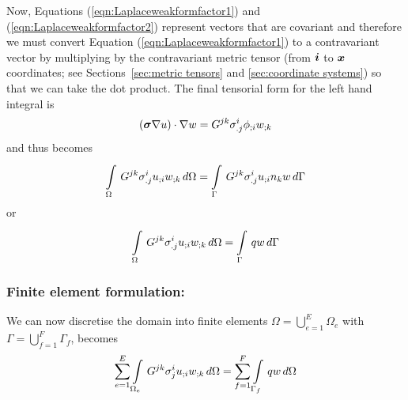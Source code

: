 Now, Equations (\ref{eqn:Laplaceweakformfactor1}) and (\ref{eqn:Laplaceweakformfactor2})
represent vectors that are covariant and therefore we must convert Equation
(\ref{eqn:Laplaceweakformfactor1}) to a contravariant vector by 
multiplying by the contravariant metric tensor (from $\boldsymbol{i}$ to $\boldsymbol{x}$ 
coordinates; see Sections~\ref{sec:metric tensors} and \ref{sec:coordinate systems})
so that we can take the dot product. The final tensorial form for the left
hand integral is
\begin{equation}
  \dotprod{\pbrac{\tensor{\sigma}\gradient{}{u}}}{\gradient{}{w}} = 
  G^{jk}\sigma^{i}_{.j}\covarderiv{\phi}{i}\covarderiv{w}{k}
\end{equation}
and thus  becomes
\begin{equation}
  \gint{\Omega}{}{G^{jk}\sigma^{i}_{.j}\covarderiv{u}{i}\covarderiv{w}{k}}{\Omega}
  = \gint{\Gamma}{}{G^{jk}\sigma^{i}_{.j}\covarderiv{u}{i}n_{k}w}{\Gamma}
  \label{eqn:Laplaceweightedresidualtensorform1}
\end{equation}
or
\begin{equation}
  \gint{\Omega}{}{G^{jk}\sigma^{i}_{.j}\covarderiv{u}{i}\covarderiv{w}{k}}{\Omega}
  = \gint{\Gamma}{}{qw}{\Gamma}
  \label{eqn:Laplaceweightedresidualtensorform2}
\end{equation}

\subsubsection{Finite element formulation:}

We can now discretise the domain into finite elements \ie $\Omega=
\displaystyle{\bigcup_{e=1}^{E}}\Omega_{e}$ with
$\Gamma=\displaystyle{\bigcup_{f=1}^{F}}\Gamma_{f}$, 
 becomes
\begin{equation}
  \displaystyle\sum_{e=1}^{E}  \displaystyle\int\limits_{\Omega_{e}}^{} \,G^{jk}\sigma^{i}_{j} {u}_{;i}  {w}_{;k} \,d\Omega 
  =\displaystyle\sum_{f=1}^{F}  \displaystyle\int\limits_{\Gamma_{f}}^{} \,qw\,d\Omega 
\end{equation}

